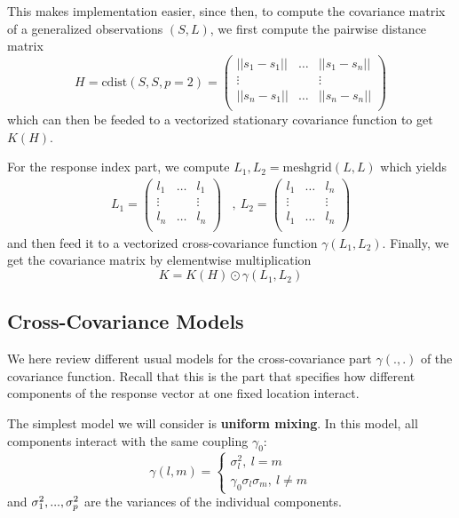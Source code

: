 \documentclass[a4paper,10pt]{article}
\begin{document}
This makes implementation easier, since then, to compute the covariance matrix
of a generalized observations $\left(S, L\right)$, we first compute the
pairwise distance matrix
\[
    H = \textrm{cdist}\left(S,S, p=2\right) = \begin{pmatrix}
        ||s_1 - s_1|| & \dots & ||s_1 - s_n||\\
        \vdots &  & \vdots \\
        ||s_n - s_1|| & \dots & ||s_n - s_n||\\
    \end{pmatrix}
\]
which can then be feeded to a vectorized stationary covariance function to get
$K(H)$.

For the response index part, we compute $L_1, L_2=\textrm{meshgrid}\left(L,
L\right)$ which yields
\begin{align*}
    L_1 =  \begin{pmatrix}
        l_1 & \dots & l_1\\
        \vdots &  & \vdots \\
        l_n & \dots & l_n\\
    \end{pmatrix}
    &,~ 
    L_2 =  \begin{pmatrix}
        l_1 & \dots & l_n\\
        \vdots &  & \vdots \\
        l_1 & \dots & l_n\\
    \end{pmatrix}
\end{align*}
and then feed it to a vectorized cross-covariance function $\gamma(L_1, L_2)$.
Finally, we get the covariance matrix by elementwise multiplication
\[
    K = K\left(H\right) \odot \gamma\left(L_1, L_2\right)
\]

\subsection{Cross-Covariance Models}
We here review different usual models for the cross-covariance part $\gamma(.,
.)$ of the covariance function. Recall that this is the part that specifies how
different components of the response vector at one fixed location interact.

\medskip
The simplest model we will consider is \textbf{uniform mixing}. In this model,
all components interact with the same coupling $\gamma_0$:
\begin{equation}
    \gamma(l, m) = \begin{cases} \sigma_l^2,~ l=m\\ 
        \gamma_0\sigma_l\sigma_m,~l\neq m
    \end{cases}
\end{equation}
and $\sigma_1^2, ..., \sigma_{p}^2$ are the variances of the individual
components.
\end{document}
